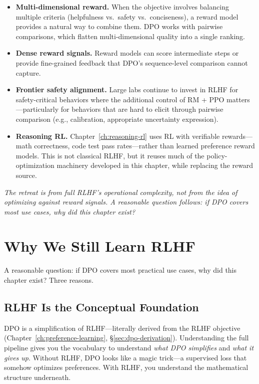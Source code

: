 \begin{itemize}[nosep]
  \item \textbf{Multi-dimensional reward.} When the objective involves balancing multiple criteria (helpfulness vs.\ safety vs.\ conciseness), a reward model provides a natural way to combine them. DPO works with pairwise comparisons, which flatten multi-dimensional quality into a single ranking.
  \item \textbf{Dense reward signals.} Reward models can score intermediate steps or provide fine-grained feedback that DPO's sequence-level comparison cannot capture.
  \item \textbf{Frontier safety alignment.} Large labs continue to invest in RLHF for safety-critical behaviors where the additional control of RM + PPO matters---particularly for behaviors that are hard to elicit through pairwise comparison (e.g., calibration, appropriate uncertainty expression).
  \item \textbf{Reasoning RL.} Chapter~\ref{ch:reasoning-rl} uses RL with verifiable rewards---math correctness, code test pass rates---rather than learned preference reward models. This is not classical RLHF, but it reuses much of the policy-optimization machinery developed in this chapter, while replacing the reward source.
\end{itemize}

\medskip
\noindent\textit{The retreat is from full RLHF's operational complexity, not from the idea of optimizing against reward signals. A reasonable question follows: if DPO covers most use cases, why did this chapter exist?}


\section{Why We Still Learn RLHF}
\label{sec:why-learn-rlhf}

A reasonable question: if DPO covers most practical use cases, why did this chapter exist? Three reasons.

\subsection{RLHF Is the Conceptual Foundation}

DPO is a simplification of RLHF---literally derived from the RLHF objective (Chapter~\ref{ch:preference-learning}, \S\ref{sec:dpo-derivation}). Understanding the full pipeline gives you the vocabulary to understand \emph{what DPO simplifies} and \emph{what it gives up}. Without RLHF, DPO looks like a magic trick---a supervised loss that somehow optimizes preferences. With RLHF, you understand the mathematical structure underneath.

